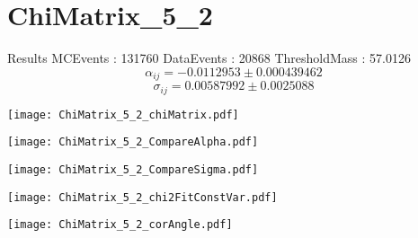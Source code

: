 \documentclass[a4paper,12pt]{article}
\begin{document}
\section{ChiMatrix\_5\_2}
\begin{minipage}{0.49\linewidth} Results \newline
MCEvents : 131760\newline
DataEvents : 20868 \newline
ThresholdMass : 57.0126\\
$$\alpha_{ij} = -0.0112953\pm 0.000439462$$
$$\sigma_{ij} = 0.00587992\pm 0.0025088$$
\end{minipage}\hfill
\begin{minipage}{0.49\linewidth} 
\texttt{[image: ChiMatrix\_5\_2\_chiMatrix.pdf]}\\
\end{minipage}
\hfill
\begin{minipage}{0.49\linewidth} 
\texttt{[image: ChiMatrix\_5\_2\_CompareAlpha.pdf]}\\
\end{minipage}
\hfill
\begin{minipage}{0.49\linewidth} 
\texttt{[image: ChiMatrix\_5\_2\_CompareSigma.pdf]}\\
\end{minipage}
\begin{minipage}{0.49\linewidth} 
\texttt{[image: ChiMatrix\_5\_2\_chi2FitConstVar.pdf]}\\
\end{minipage}
\hfill
\begin{minipage}{0.49\linewidth} 
\texttt{[image: ChiMatrix\_5\_2\_corAngle.pdf]}\\
\end{minipage}
\end{document}
